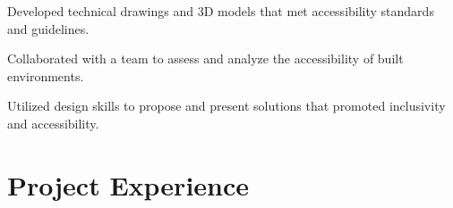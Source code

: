 \begin{minipage}[t]{0.63\textwidth}
\begin{tightemize}
    \end{tightemize}
  \sectionsep

    
    \vspace{5pt}
    \begin{tightemize}
      \item Developed technical drawings and 3D models that met accessibility standards and guidelines.
      \item Collaborated with a team to assess and analyze the accessibility of built environments.
      \item Utilized design skills to propose and present solutions that promoted inclusivity and accessibility.
      
    \end{tightemize}
  \sectionsep

  \section{Project Experience}
    
  \end{minipage}
